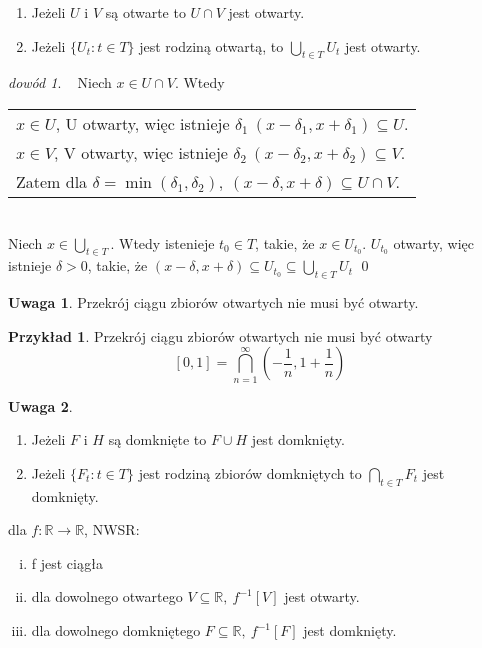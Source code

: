 \documentclass[twoside,10pt]{article}
\theoremstyle{definition}
\theoremstyle{definition}
\theoremstyle{definition}
\theoremstyle{definition}
\theoremstyle{remark}
\newtheorem*{dd}{dowód}
\theoremstyle{definition}
\newtheorem*{uw}{Uwaga}
\theoremstyle{definition}
\theoremstyle{definition}
\theoremstyle{definition}
\newtheorem*{prz}{Przykład}
\theoremstyle{definition}
\theoremstyle{definition}
\begin{document}
\begin{tw} 
    \hfill
    \begin{enumerate}[{(}1{)}]
        \item Jeżeli $U$ i $V$ są otwarte to $U \cap V $ jest otwarty. 
        \item Jeżeli $\{U_t : t \in T\}$ jest rodziną otwartą, to $ \bigcup\limits_{t \in T} U_t $ jest otwarty.
    \end{enumerate}
\end{tw} 
\begin{dd} 
    ~\newline
    Niech $x \in U \cap V$. Wtedy 
    \begin{tabular}[t]{l} 
    $x \in U $, U otwarty, więc istnieje $\delta_1 \ (x-\delta_1,x+\delta_1) \subseteq U$.\\
    $x \in V$, V otwarty, więc istnieje $\delta_2 \ (x-\delta_2,x+\delta_2) \subseteq V.$ \\ 
    Zatem dla $\delta = \min(\delta_1,\delta_2), \ (x-\delta,x+\delta) \subseteq U \cap V$.
    \end{tabular} \\[5mm]
    Niech $x \in \bigcup\limits_{t \in T} $. Wtedy istenieje $t_0 \in T$,
    takie, że $x \in U_{t_0}$. $U_{t_0}$ otwarty, więc istnieje $\delta > 0$,
    takie, że $( x - \delta, x+\delta) \subseteq U_{t_0} \subseteq \bigcup\limits_{t \in T} U_t $
    \qed
\end{dd}
\begin{uw}
    Przekrój ciągu zbiorów otwartych nie musi być otwarty.
\end{uw}
\begin{prz}
    Przekrój ciągu zbiorów otwartych nie musi być otwarty
    \[ [0,1] = \bigcap_{n=1}^\infty (-\frac{1}{n},1+\frac{1}{n}) \]
\end{prz}
\begin{uw} 
    \hfill
    \begin{enumerate}[(1)]
        \item Jeżeli $F$ i $H$ są domknięte to $F \cup H$ jest domknięty. 
        \item Jeżeli $\{ F_t : t \in T \}$ jest rodziną zbiorów domkniętych to $\bigcap\limits_{t \in T} F_t$ jest domknięty.
    \end{enumerate}
\end{uw}

\begin{tw}
    dla $f: \mathbb{R} \rightarrow \mathbb{R}$, NWSR: 
    \begin{enumerate}[(i)]
        \item f jest ciągła 
        \item dla dowolnego otwartego $V \subseteq \mathbb{R}, \  f^{-1}[V]$ jest otwarty.  
        \item dla dowolnego domkniętego $ F \subseteq \mathbb{R}, \ f^{-1}[F]$ jest domknięty. 
    \end{enumerate}
\end{tw}
\end{document}
